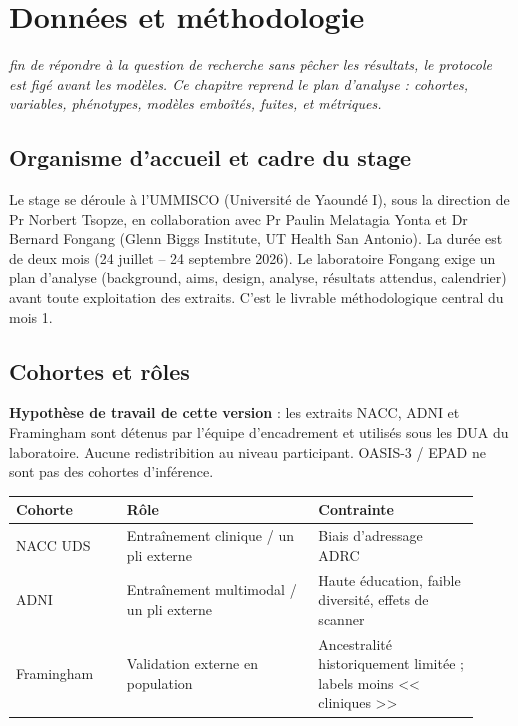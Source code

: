 \let\textcircled=\pgftextcircled
\chapter{Données et méthodologie}
\label{chap:contrib}

\textit{fin de répondre à la question de recherche sans pêcher les résultats, le protocole est figé avant les modèles. Ce chapitre reprend le plan d'analyse : cohortes, variables, phénotypes, modèles emboîtés, fuites, et métriques.}

\newpage

\section{Organisme d'accueil et cadre du stage}

Le stage se déroule à l'\ac{UMMISCO} (Université de Yaoundé I), sous la direction de Pr Norbert Tsopze, en collaboration avec Pr Paulin Melatagia Yonta et Dr Bernard Fongang (Glenn Biggs Institute, UT Health San Antonio). La durée est de deux mois (24 juillet -- 24 septembre 2026). Le laboratoire Fongang exige un plan d'analyse (background, aims, design, analyse, résultats attendus, calendrier) avant toute exploitation des extraits. C'est le livrable méthodologique central du mois 1.

\section{Cohortes et rôles}

\textbf{Hypothèse de travail de cette version} : les extraits NACC, ADNI et Framingham sont détenus par l'équipe d'encadrement et utilisés sous les DUA du laboratoire. Aucune redistribition au niveau participant. OASIS-3 / EPAD ne sont pas des cohortes d'inférence.

\begin{center}
\begin{tabular}{p{0.22\linewidth}p{0.38\linewidth}p{0.32\linewidth}}
\hline
\textbf{Cohorte} & \textbf{Rôle} & \textbf{Contrainte} \\
\hline
NACC UDS & Entraînement clinique / un pli externe & Biais d'adressage ADRC \\
ADNI & Entraînement multimodal / un pli externe & Haute éducation, faible diversité, effets de scanner \\
Framingham & Validation externe en population & Ancestralité historiquement limitée ; labels moins << cliniques >> \\
            \hline
        \end{tabular}
\end{center}

